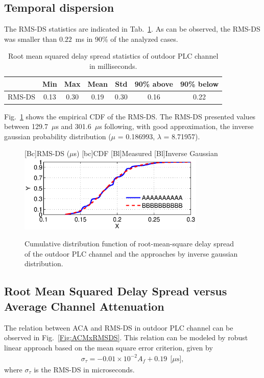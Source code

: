 \documentclass[journal]{IEEEtran}
\newcommand{\tamfig}{3.5in}    %
\begin{document}
\subsection{Temporal dispersion}\label{sec-rmsds}
The \ac{RMS-DS} statistics are indicated in Tab.~\ref{Tab:EstatisticasRMS}. As can be observed, the RMS-DS was smaller than $0.22$~ms in 90\% of the analyzed cases. 
\begin{table}[!htb]
\centering
\caption{Root mean squared delay spread statistics of outdoor PLC channel in milliseconds.}
\footnotesize  
\begin{tabular}{c|c|c|c|c|c|c}
\hline 
           &  Min    & Max    & Mean    & Std    & 90\% above    & 90\% below \\
\hline 
RMS-DS     & 0.13   & 0.30  &  0.19    & 0.30   & 0.16          & 0.22 \\
\hline
\end{tabular} \label{Tab:EstatisticasRMS}
\newline
\end{table}   

Fig.~\ref{Fig:RMSDS_CDF} shows the empirical \ac{CDF} of the RMS-DS. The RMS-DS presented values between 129.7~$\mu$s and 301.6~$\mu$s following, with good approximation, the inverse gaussian probability distribution ($\mu$ = 0.186993, $\lambda$ = 8.71957).
\begin{figure}[!htp]
\begin{centering}
    [Bc]{RMS-DS ($\mu$s)}    
    [bc]{CDF}
    [Bl]{Measured}
    [Bl]{Inverse Gaussian}
    \includegraphics[width=\tamfig]{Figuras/RMSDS_CDF.eps}
    \caption{Cumulative distribution function of root-mean-square delay spread of the outdoor \ac{PLC} channel and the approaches by inverse gaussian distribution.}
    \label{Fig:RMSDS_CDF}
\end{centering}
\end{figure}


\subsection{Root Mean Squared Delay Spread versus Average Channel Attenuation}
The relation between ACA and RMS-DS in outdoor \ac{PLC} channel can be observed in Fig.~\ref{Fig:ACMxRMSDS}. This relation can be modeled by robust linear approach based on the mean square error criterion, given by   
\begin{eqnarray} \label{eq-ACMxRMSDS}
\sigma_{\tau} = - 0.01 \times1 0^{-2}A_f + 0.19 \   \  \mbox{[$\mu$s]},    
\end{eqnarray}
where $\sigma_{\tau}$ is the RMS-DS in microseconds.
\end{document}
